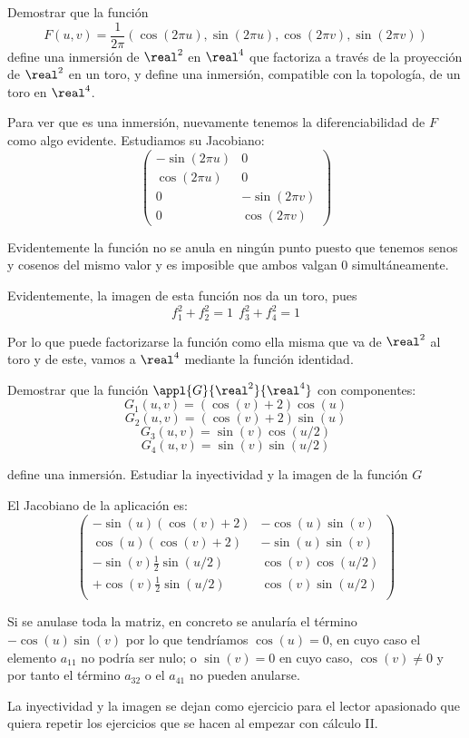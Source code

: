 \begin{problem}[7]
Demostrar que la función
\[F(u,v)=\frac{1}{2π}\left(\cos(2πu),\sin(2πu),\cos(2πv),\sin(2πv) \right)\]
define una inmersión de $\real^2$ en $\real^4$ que factoriza a través de la proyección de $\real^2$ en un toro, y define una inmersión, compatible con la topología, de un toro en $\real^4$.

\solution


Para ver que es una inmersión, nuevamente tenemos la diferenciabilidad de $F$ como algo evidente. Estudiamos su Jacobiano:
\[ \left( \begin{array}{cc}
-\sin(2πu) & 0 \\
\cos(2πu) & 0 \\
0 & -\sin(2πv) \\
0 & \cos(2πv) \end{array} \right)\]

Evidentemente la función no se anula en ningún punto puesto que tenemos senos y cosenos del mismo valor y es imposible que ambos valgan 0 simultáneamente.

Evidentemente, la imagen de esta función nos da un toro, pues
\[f_1^2+f_2^2 = 1 \ \ f_3^2+f_4^2 = 1\]

Por lo que puede factorizarse la función como ella misma que va de $\real^2$ al toro y de este, vamos a $\real^4$ mediante la función identidad.
\end{problem}

\begin{problem}[8]
Demostrar que la función $\appl{G}{\real^2}{\real^4}$ con componentes:
\[G_1(u,v)=(\cos(v)+2)\cos(u)\]
\[G_2(u,v)=(\cos(v)+2)\sin(u)\]
\[G_3(u,v)=\sin(v)\cos(u/2)\]
\[G_4(u,v)=\sin(v)\sin(u/2)\]

define una inmersión. Estudiar la inyectividad y la imagen de la función $G$
\solution


El Jacobiano de la aplicación es:
\[ \left( \begin{array}{cc}
-\sin(u)(\cos(v)+2) & -\cos(u)\sin(v) \\
\cos(u)(\cos(v)+2) & -\sin(u)\sin(v) \\
-\sin(v)\frac{1}{2}\sin(u/2) & \cos(v)\cos(u/2) \\
+\cos(v)\frac{1}{2}\sin(u/2) & \cos(v)\sin(u/2) \\ \end{array} \right)\]

Si se anulase toda la matriz, en concreto se anularía el término $-\cos(u)\sin(v)$ por lo que tendríamos $\cos(u)=0$, en cuyo caso el elemento $a_{11}$ no podría ser nulo; o $\sin(v)=0$ en cuyo caso, $\cos(v)\neq 0$ y por tanto el término $a_{32}$ o el $a_{41}$ no pueden anularse.

La inyectividad y la imagen se dejan como ejercicio para el lector apasionado que quiera repetir los ejercicios que se hacen al empezar con cálculo II.
\end{problem}

